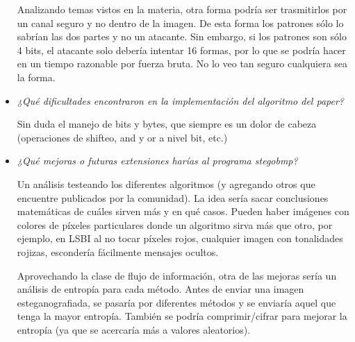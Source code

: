 \documentclass[a4paper,12pt]{article}
\begin{document}
\begin{itemize}
		Analizando temas vistos en la materia, otra forma podría ser trasmitirlos por un canal seguro y no dentro de la imagen. De esta forma los patrones sólo lo sabrían las dos partes y no un atacante. Sin embargo, si los patrones son sólo 4 bits, el atacante solo debería intentar 16 formas, por lo que se podría hacer en un tiempo razonable por fuerza bruta. No lo veo tan seguro cualquiera sea la forma.
		
		\item \textit{¿Qué dificultades encontraron en la implementación del algoritmo del paper?}
		
		Sin duda el manejo de bits y bytes, que siempre es un dolor de cabeza (operaciones de shifteo, and y or a nivel bit, etc.)
		
		\item \textit{¿Qué mejoras o futuras extensiones harías al programa stegobmp?}
		
		Un análisis testeando los diferentes algoritmos (y agregando otros que encuentre publicados por la comunidad). La idea sería sacar conclusiones matemáticas de cuáles sirven más y en qué casos. Pueden haber imágenes con colores de píxeles particulares donde un algoritmo sirva más que otro, por ejemplo, en LSBI al no tocar píxeles rojos, cualquier imagen con tonalidades rojizas, escondería fácilmente mensajes ocultos.
		
		Aprovechando la clase de flujo de información, otra de las mejoras sería un análisis de entropía para cada método. Antes de enviar una imagen esteganografiada, se pasaría por diferentes métodos y se enviaría aquel que tenga la mayor entropía. También se podría comprimir/cifrar para mejorar la entropía (ya que se acercaría más a valores aleatorios).
	
	\end{itemize}
	
\end{document}
